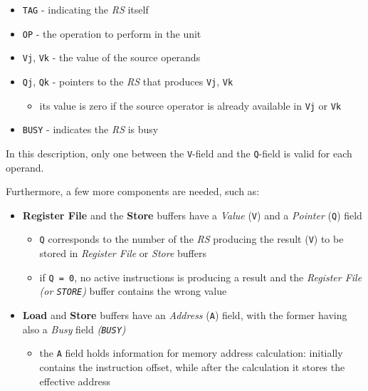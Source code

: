 \documentclass[english]{article}
\begin{document}
\begin{itemize}
  \item \texttt{TAG} - indicating the \textit{RS} itself
  \item \texttt{OP} - the operation to perform in the unit
  \item \texttt{Vj}, \texttt{Vk} - the value of the source operands
  \item \texttt{Qj}, \texttt{Qk} - pointers to the \textit{RS} that produces \texttt{Vj}, \texttt{Vk}
        \begin{itemize}
          \item its value is zero if the source operator is already available in \texttt{Vj} or \texttt{Vk}
        \end{itemize}
  \item \texttt{BUSY} - indicates the \textit{RS} is busy
\end{itemize}

In this description, only one between the \texttt{V}-field and the \texttt{Q}-field is valid for each operand.

\bigskip
Furthermore, a few more components are needed, such as:

\begin{itemize}
  \item \textbf{Register File} and the \textbf{Store} buffers have a \textit{Value} (\texttt{V}) and a \textit{Pointer} (\texttt{Q}) field
        \begin{itemize}
          \item \texttt{Q} corresponds to the number of the \textit{RS} producing the result (\texttt{V}) to be stored in \textit{Register File} or \textit{Store} buffers
          \item if \texttt{Q = 0}, no active instructions is producing a result and the \textit{Register File} \textit{(or \texttt{STORE})} buffer contains the wrong value
        \end{itemize}
  \item \textbf{Load} and \textbf{Store} buffers have an \textit{Address} (\texttt{A}) field, with the former having also a \textit{Busy} field \textit{(\texttt{BUSY})}
        \begin{itemize}
          \item the \texttt{A} field holds information for memory address calculation: initially contains the instruction offset, while after the calculation it stores the effective address
        \end{itemize}
\end{itemize}
\end{document}
